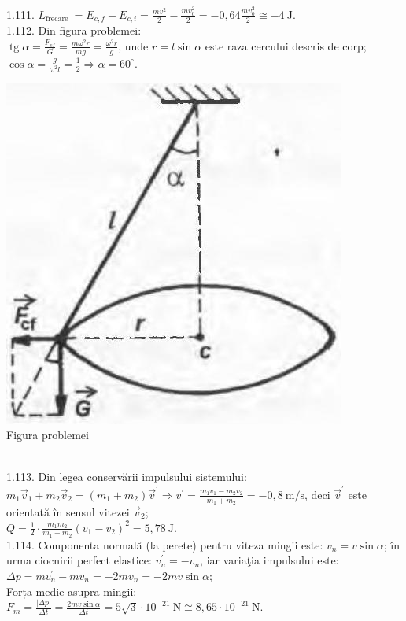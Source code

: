 1.111. $L_{\text {frecare }}=E_{c, f}-E_{c, i}=\frac{m v^{2}}{2}-\frac{m v_{0}^{2}}{2}=-0,64 \frac{m v_{0}^{2}}{2} \cong -4 \mathrm{~J}$.\\

1.112. Din figura problemei:\\ $\operatorname{tg} \alpha=\frac{F_{c f}}{G}=\frac{m \omega^{2} r}{m g}=\frac{\omega^{2} r}{g}$, unde $r=l \sin \alpha$ este raza cercului descris de corp;\\ $\cos \alpha=\frac{g}{\omega^{2} l}=\frac{1}{2} \Rightarrow \alpha=60^{\circ}$.\\ \begin{center} \includegraphics[width=0.4\linewidth]{images/2025_07_01_5b3ff9fa0d508c8e9f17g-221}\\ Figura problemei \end{center}\\

1.113. Din legea conservării impulsului sistemului:\\ $m_{1} \vec{v}_{1}+m_{2} \vec{v}_{2}=\left(m_{1}+m_{2}\right) \vec{v}^{\prime} \Rightarrow v^{\prime}=\frac{m_{1} v_{1}-m_{2} v_{2}}{m_{1}+m_{2}}=-0,8 \mathrm{~m} / \mathrm{s}$, deci $\vec{v}^{\prime}$ este orientată în sensul vitezei $\vec{v}_{2}$;\\ $Q=\frac{1}{2} \cdot \frac{m_{1} m_{2}}{m_{1}+m_{2}}\left(v_{1}-v_{2}\right)^{2}=5,78 \mathrm{~J}$.\\

1.114. Componenta normală (la perete) pentru viteza mingii este: $v_{n}=v \sin \alpha$; în urma ciocnirii perfect elastice: $v_{n}^{\prime}=-v_{n}$, iar variaţia impulsului este:\\ $\Delta p=m v_{n}^{\prime}-m v_{n}=-2 m v_{n}=-2 m v \sin \alpha$;\\ Forța medie asupra mingii:\\ $F_{m}=\frac{|\Delta p|}{\Delta t}=\frac{2 m v \sin \alpha}{\Delta t}=5 \sqrt{3} \cdot 10^{-21} \mathrm{~N} \cong 8,65 \cdot 10^{-21} \mathrm{~N}$.\\

